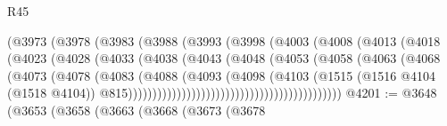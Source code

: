 \begin{lexlean}{R45}
\begin{coremodule}
{                                    (@3973
                                      (@3978
                                        (@3983
                                          (@3988
                                            (@3993
                                              (@3998
                                                (@4003
                                                  (@4008
                                                    (@4013
                                                      (@4018
                                                        (@4023
                                                          (@4028
                                                            (@4033
                                                              (@4038
                                                                (@4043
                                                                  (@4048
                                                                    (@4053
                                                                      (@4058
                                                                        (@4063
                                                                          (@4068
                                                                            (@4073
                                                                              (@4078
                                                                                (@4083
                                                                                  (@4088
                                                                                    (@4093
                                                                                      (@4098
                                                                                        (@4103
                                                                                          (@1515
                                                                                            (@1516
                                                                                              @4104
                                                                                              (@1518
                                                                                                @4104))
                                                                                            @815))))))))))))))))))))))))))))))))))))))))))))
@4201 := @3648
    (@3653
      (@3658
        (@3663
          (@3668
            (@3673
              (@3678
}
\end{coremodule}
\end{lexlean}
